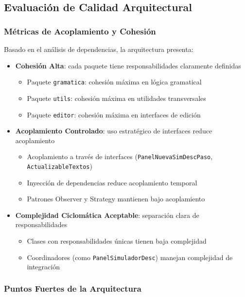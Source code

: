 \subsection{Evaluación de Calidad Arquitectural}

\subsubsection{Métricas de Acoplamiento y Cohesión}

Basado en el análisis de dependencias, la arquitectura presenta:

\begin{itemize}
    \item \textbf{Cohesión Alta}: cada paquete tiene responsabilidades claramente definidas
    \begin{itemize}
        \item Paquete \texttt{gramatica}: cohesión máxima en lógica gramatical
        \item Paquete \texttt{utils}: cohesión máxima en utilidades transversales
        \item Paquete \texttt{editor}: cohesión máxima en interfaces de edición
    \end{itemize}

    \item \textbf{Acoplamiento Controlado}: uso estratégico de interfaces reduce acoplamiento
    \begin{itemize}
        \item Acoplamiento a través de interfaces (\texttt{PanelNuevaSimDescPaso}, \texttt{ActualizableTextos})
        \item Inyección de dependencias reduce acoplamiento temporal
        \item Patrones Observer y Strategy mantienen bajo acoplamiento
    \end{itemize}

    \item \textbf{Complejidad Ciclomática Aceptable}: separación clara de responsabilidades
    \begin{itemize}
        \item Clases con responsabilidades únicas tienen baja complejidad
        \item Coordinadores (como \texttt{PanelSimuladorDesc}) manejan complejidad de integración
    \end{itemize}
\end{itemize}

\subsubsection{Puntos Fuertes de la Arquitectura}

